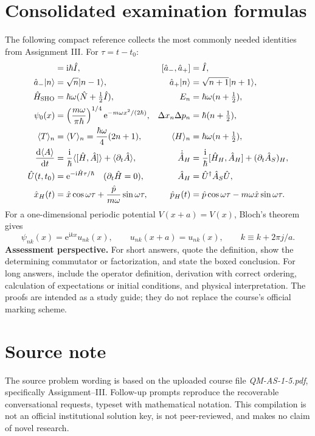 \documentclass[11pt,a4paper]{article}
\newcommand{\dd}{\mathrm{d}}\newcommand{\iu}{\mathrm{i}}\newcommand{\ee}{\mathrm{e}}
\newcommand{\avg}[1]{\langle #1\rangle}\newcommand{\Sch}{Schr\"odinger}
\begin{document}
\section{Consolidated examination formulas}
The following compact reference collects the most commonly needed identities from Assignment III. For \(\tau=t-t_0\):
\begin{align}
[\hat x,\hat p]&=\iu\hbar\hat I,&
[\hat a_-,\hat a_+]&=\hat I,\\
\hat a_-\ket n&=\sqrt n\ket{n-1},&
\hat a_+\ket n&=\sqrt{n+1}\ket{n+1},\\
\hat H_{\mathrm{SHO}}&=\hbar\omega(\hat N+\tfrac12\hat I),&
E_n&=\hbar\omega(n+\tfrac12),\\
\psi_0(x)&=\left(\frac{m\omega}{\pi\hbar}\right)^{1/4}\ee^{-m\omega x^2/(2\hbar)},&
\Delta x_n\Delta p_n&=\hbar(n+\tfrac12),\\
\avg T_n&=\avg V_n=\frac{\hbar\omega}{4}(2n+1),&
\avg H_n&=\hbar\omega(n+\tfrac12),\\
\frac{\dd\avg A}{\dd t}&=\frac{\iu}{\hbar}\avg{[\hat H,\hat A]}+\avg{\partial_t\hat A},&
\dot{\hat A}_H&=\frac{\iu}{\hbar}[\hat H_H,\hat A_H]+(\partial_t\hat A_S)_H,\\
\hat U(t,t_0)&=\ee^{-\iu\hat H\tau/\hbar}\quad(\partial_t\hat H=0),&
\hat A_H&=\hat U^\dagger\hat A_S\hat U,\\
\hat x_H(t)&=\hat x\cos\omega\tau+\frac{\hat p}{m\omega}\sin\omega\tau,&
\hat p_H(t)&=\hat p\cos\omega\tau-m\omega\hat x\sin\omega\tau.
\end{align}
For a one-dimensional periodic potential \(V(x+a)=V(x)\), Bloch's theorem gives
\begin{equation}\boxed{\psi_{nk}(x)=\ee^{\iu kx}u_{nk}(x),\qquad u_{nk}(x+a)=u_{nk}(x),\qquad k\equiv k+2\pi j/a.}\end{equation}
\textbf{Assessment perspective.} For short answers, quote the definition, show the determining commutator or factorization, and state the boxed conclusion. For long answers, include the operator definition, derivation with correct ordering, calculation of expectations or initial conditions, and physical interpretation. The proofs are intended as a study guide; they do not replace the course's official marking scheme.

\section*{Source note}
The source problem wording is based on the uploaded course file \emph{QM-AS-1-5.pdf}, specifically Assignment--III. Follow-up prompts reproduce the recoverable conversational requests, typeset with mathematical notation. This compilation is not an official institutional solution key, is not peer-reviewed, and makes no claim of novel research.
\end{document}
